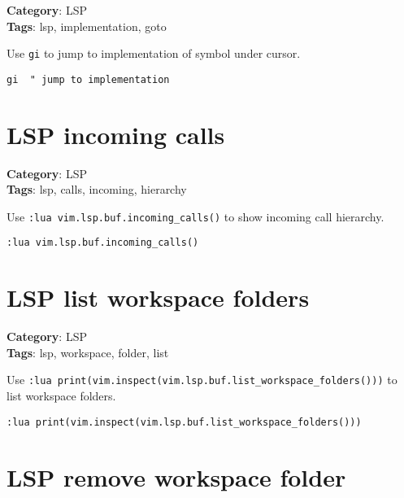 {{{{{{\textbf{Category}: LSP\\ \textbf{Tags}: lsp, implementation, goto
\vspace{0.5cm}

Use {\footnotesize \Verb§gi§} to jump to implementation of symbol under cursor.

\begin{Exa*}{}
\begin{Verbatim}[fontsize=\footnotesize, breaklines, breakanywhere]
gi  " jump to implementation
\end{Verbatim}
\end{Exa*}

\section{LSP incoming calls}

\textbf{Category}: LSP\\ \textbf{Tags}: lsp, calls, incoming, hierarchy
\vspace{0.5cm}

Use {\footnotesize \Verb§:lua vim.lsp.buf.incoming_calls()§} to show incoming call hierarchy.

\begin{Exa*}{}
\begin{Verbatim}[fontsize=\footnotesize, breaklines, breakanywhere]
:lua vim.lsp.buf.incoming_calls()
\end{Verbatim}
\end{Exa*}

\section{LSP list workspace folders}

\textbf{Category}: LSP\\ \textbf{Tags}: lsp, workspace, folder, list
\vspace{0.5cm}

Use {\footnotesize \Verb§:lua print(vim.inspect(vim.lsp.buf.list_workspace_folders()))§} to list workspace folders.

\begin{Exa*}{}
\begin{Verbatim}[fontsize=\footnotesize, breaklines, breakanywhere]
:lua print(vim.inspect(vim.lsp.buf.list_workspace_folders()))
\end{Verbatim}
\end{Exa*}

\section{LSP remove workspace folder}

}}}}}}
